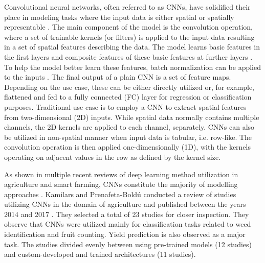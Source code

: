 Convolutional neural networks, often referred to as CNNs, have solidified their place in modeling tasks where the input data is either spatial or spatially representable \cite{Krizhevsky2017,Szegedy2015}. The main component of the model is the convolution operation, where a set of trainable kernels (or filters) is applied to the input data resulting in a set of spatial features describing the data. The model learns basic features in the first layers and composite features of these basic features at further layers \cite{Zeiler2014}. To help the model better learn these features, batch normalization can be applied to the inputs \cite{Ioffe2015}. The final output of a plain CNN is a set of feature maps. Depending on the use case, these can be either directly utilized or, for example, flattened and fed to a fully connected (FC) layer for regression or classification purposes. Traditional use case is to employ a CNN to extract spatial features from two-dimensional (2D) inputs. While spatial data normally contains multiple channels, the 2D kernels are applied to each channel, separately. CNNs can also be utilized in non-spatial manner when input data is tabular, i.e. row-like. The convolution operation is then applied one-dimensionally (1D), with the kernels operating on adjacent values in the row as defined by the kernel size.

As shown in multiple recent reviews of deep learning method utilization in agriculture and smart farming, CNNs constitute the majority of modelling approaches \cite{Kamilaris2018a,VanKlompenburg2020}. Kamilars and Prenafeta-Bold{\'{u}} conducted a review of studies utilizing CNNs in the domain of agriculture and published between the years 2014 and 2017 \cite{Kamilaris2018b}. They selected a total of 23 studies for closer inspection. They observe that CNNs were utilized mainly for classification tasks related to weed identification and fruit counting. Yield prediction is also observed as a major task. The studies divided evenly between using pre-trained models (12 studies) and custom-developed and trained architectures (11 studies). 


